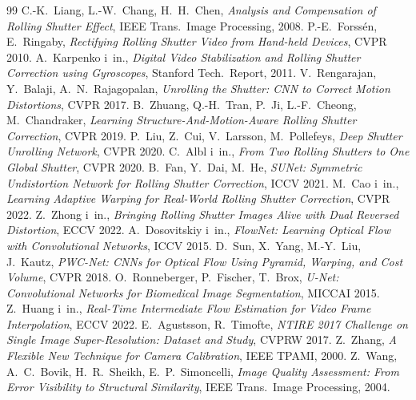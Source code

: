 \documentclass[11pt,a4paper]{article}
\begin{document}
\begin{thebibliography}{99}\small
{} C.-K.~Liang, L.-W.~Chang, H.~H.~Chen, \emph{Analysis and Compensation of Rolling Shutter Effect}, IEEE Trans.\ Image Processing, 2008.
 P.-E.~Forssén, E.~Ringaby, \emph{Rectifying Rolling Shutter Video from Hand-held Devices}, CVPR 2010.
 A.~Karpenko i~in., \emph{Digital Video Stabilization and Rolling Shutter Correction using Gyroscopes}, Stanford Tech.\ Report, 2011.
 V.~Rengarajan, Y.~Balaji, A.~N.~Rajagopalan, \emph{Unrolling the Shutter: CNN to Correct Motion Distortions}, CVPR 2017.
 B.~Zhuang, Q.-H.~Tran, P.~Ji, L.-F.~Cheong, M.~Chandraker, \emph{Learning Structure-And-Motion-Aware Rolling Shutter Correction}, CVPR 2019.
 P.~Liu, Z.~Cui, V.~Larsson, M.~Pollefeys, \emph{Deep Shutter Unrolling Network}, CVPR 2020.
 C.~Albl i~in., \emph{From Two Rolling Shutters to One Global Shutter}, CVPR 2020.
 B.~Fan, Y.~Dai, M.~He, \emph{SUNet: Symmetric Undistortion Network for Rolling Shutter Correction}, ICCV 2021.
 M.~Cao i~in., \emph{Learning Adaptive Warping for Real-World Rolling Shutter Correction}, CVPR 2022.
 Z.~Zhong i~in., \emph{Bringing Rolling Shutter Images Alive with Dual Reversed Distortion}, ECCV 2022.
 A.~Dosovitskiy i~in., \emph{FlowNet: Learning Optical Flow with Convolutional Networks}, ICCV 2015.
 D.~Sun, X.~Yang, M.-Y.~Liu, J.~Kautz, \emph{PWC-Net: CNNs for Optical Flow Using Pyramid, Warping, and Cost Volume}, CVPR 2018.
 O.~Ronneberger, P.~Fischer, T.~Brox, \emph{U-Net: Convolutional Networks for Biomedical Image Segmentation}, MICCAI 2015.
 Z.~Huang i~in., \emph{Real-Time Intermediate Flow Estimation for Video Frame Interpolation}, ECCV 2022.
 E.~Agustsson, R.~Timofte, \emph{NTIRE 2017 Challenge on Single Image Super-Resolution: Dataset and Study}, CVPRW 2017.
 Z.~Zhang, \emph{A Flexible New Technique for Camera Calibration}, IEEE TPAMI, 2000.
 Z.~Wang, A.~C.~Bovik, H.~R.~Sheikh, E.~P.~Simoncelli, \emph{Image Quality Assessment: From Error Visibility to Structural Similarity}, IEEE Trans.\ Image Processing, 2004.
\end{thebibliography}
\end{document}
